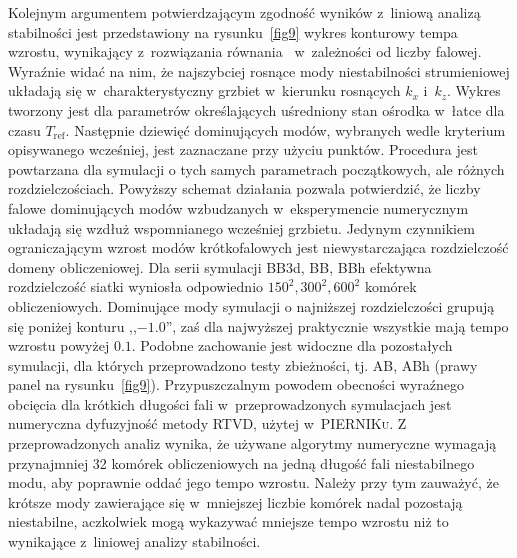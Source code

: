 \par Kolejnym argumentem potwierdzającym zgodność wyników z~liniową analizą
stabilności jest przedstawiony na rysunku~\ref{fig9} wykres konturowy tempa
wzrostu, wynikający z~rozwiązania równania~ w~zależności od
liczby falowej. Wyraźnie widać na nim, że najszybciej rosnące mody
niestabilności strumieniowej układają się w~charakterystyczny grzbiet w~kierunku
rosnących $k_x$ i~$k_z$.  Wykres tworzony jest dla parametrów określających
uśredniony stan ośrodka w~łatce dla czasu $T_{\textrm{ref}}$.  Następnie
dziewięć dominujących modów, wybranych wedle kryterium opisywanego wcześniej,
jest zaznaczane przy użyciu punktów. Procedura jest powtarzana dla symulacji o
tych samych parametrach początkowych, ale różnych rozdzielczościach.  Powyższy
schemat działania pozwala potwierdzić, że liczby falowe dominujących modów
wzbudzanych w~eksperymencie numerycznym układają się wzdłuż wspomnianego
wcześniej grzbietu. Jedynym czynnikiem ograniczającym wzrost modów
krótkofalowych jest niewystarczająca rozdzielczość domeny obliczeniowej. Dla
serii symulacji BB3d, BB, BBh efektywna rozdzielczość siatki wyniosła
odpowiednio $150^2, 300^2, 600^2$ komórek obliczeniowych.  Dominujące mody
symulacji o najniższej rozdzielczości grupują się poniżej konturu ,,$-1.0$'',
zaś dla najwyższej praktycznie wszystkie mają tempo wzrostu powyżej $0.1$.
Podobne zachowanie jest widoczne dla pozostałych symulacji, dla których
przeprowadzono testy zbieżności, tj. AB, ABh (prawy panel na
rysunku~\ref{fig9}). Przypuszczalnym powodem obecności wyraźnego obcięcia dla
krótkich długości fali w~przeprowadzonych symulacjach jest numeryczna
dyfuzyjność metody RTVD, użytej w~\textsc{PIERNIKu}. Z przeprowadzonych analiz wynika, że
używane algorytmy numeryczne wymagają przynajmniej 32 komórek obliczeniowych
na jedną długość fali niestabilnego modu, aby poprawnie oddać jego tempo
wzrostu.  Należy przy tym zauważyć, że krótsze mody zawierające się w~mniejszej
liczbie komórek nadal pozostają niestabilne, aczkolwiek mogą wykazywać mniejsze
tempo wzrostu niż to wynikające z~liniowej analizy stabilności.
%
